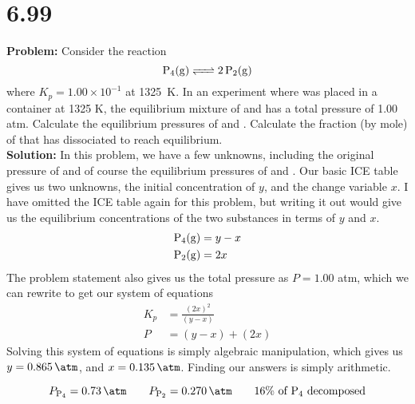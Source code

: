 \documentclass[11 pt]{article}
\begin{document}
\section*{6.99}
\textbf{Problem:} Consider the reaction $$\ce{P4(g) <=> 2P2(g)}$$ where $K_p = 1.00 \times 10^{-1}$ at \SI{1325}{\kelvin}.
In an experiment where  was placed in a container at 1325 K,  the equilibrium mixture of  and 
has a total pressure of 1.00 atm. Calculate the equilibrium pressures of  and . Calculate the fraction (by mole) of 
that has dissociated to reach equilibrium. \\

\textbf{Solution:} In this problem, we have a few unknowns, including the original 
pressure of  and of course the equilibrium pressures of  and .
Our basic ICE table gives us two unknowns, the initial concentration of  $y$,
and the change variable $x$. I have omitted the ICE table again for this problem, but writing it out
would give us the equilibrium concentrations of the two substances in terms of $y$ and $x$. 
\begin{align*}
  \ce{P4(g)} &= y - x \\
  \ce{P2(g)} &= 2x 
\end{align*}
The problem statement also gives us the total pressure as $P = 1.00$ atm, which we can rewrite to get our system of equations
\begin{align}
  K_p &= \frac{(2x)^2}{(y-x)} \\
  P &= (y-x) + (2x)
\end{align}
Solving this system of equations is simply algebraic manipulation, which gives us
$y = \SI{0.865}{\atm}$, and $x = \SI{0.135}{\atm}$. Finding our answers is simply arithmetic.
\begin{answer}
  $$P_{\ce{P4}} = \SI{0.73}{\atm} \qquad P_{\ce{P2}} = \SI{0.270}{\atm} \qquad 16\% \text{ of \ce{P4} decomposed}$$
\end{answer}
\end{document}
